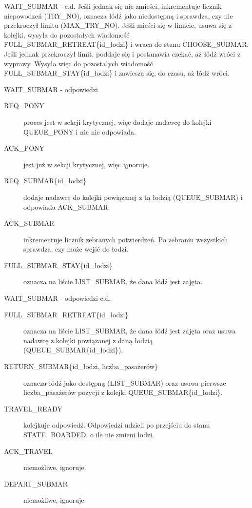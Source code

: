 \documentclass{beamer}
\begin{document}
\begin{frame}{WAIT\_SUBMAR - c.d.}
    \internallinenumbers
    \resetlinenumber[1]
    Jeśli jednak się nie zmieści, inkrementuje licznik niepowodzeń (TRY\_NO), oznacza łódź jako niedostępną i sprawdza, czy nie przekroczył limitu (MAX\_TRY\_NO). Jeśli mieści się w limicie, usuwa się z kolejki, wysyła do pozostałych wiadomość FULL\_SUBMAR\_RETREAT\{id\_łodzi\} i wraca do stanu CHOOSE\_SUBMAR. Jeśli jednak przekroczył limit, poddaje się i postanawia czekać, aż łódź wróci z wyprawy. Wysyła więc do pozostałych wiadomość FULL\_SUBMAR\_STAY\{id\_łodzi\} i zawiesza się, do czasu, aż łódź wróci.
\end{frame}

\begin{frame}{WAIT\_SUBMAR - odpowiedzi}
    \internallinenumbers
    \resetlinenumber[1]
    \begin{description}
        \item [REQ\_PONY] proces jest w sekcji krytycznej, więc dodaje nadawcę do kolejki QUEUE\_PONY i nic nie odpowiada. 
        \item [ACK\_PONY] jest już w sekcji krytycznej, więc ignoruje.
        \item [REQ\_SUBMAR\{id\_łodzi\}] dodaje nadawcę do kolejki powiązanej z tą łodzią (QUEUE\_SUBMAR) i odpowiada ACK\_SUBMAR.
        \item [ACK\_SUBMAR] inkrementuje licznik zebranych potwierdzeń. Po zebraniu wszystkich sprawdza, czy może wejść do łodzi.
        \item [FULL\_SUBMAR\_STAY\{id\_łodzi\}] oznacza na liście LIST\_SUBMAR, że dana łódź jest zajęta.

    \end{description}
\end{frame}

\begin{frame}{WAIT\_SUBMAR - odpowiedzi c.d.}
    \internallinenumbers
    \resetlinenumber[1]
    \begin{description}
        \item [FULL\_SUBMAR\_RETREAT\{id\_łodzi\}] oznacza na liście LIST\_SUBMAR, że dana łódź jest zajęta oraz usuwa nadawcę z kolejki powiązanej z daną łodzią (QUEUE\_SUBMAR\{id\_łodzi\}).
        \item [RETURN\_SUBMAR\{id\_łodzi, liczba\_pasażerów\}] oznacza łódź jako dostępną (LIST\_SUBMAR) oraz usuwa pierwsze liczba\_pasażerów pozycji z kolejki QUEUE\_SUBMAR\{id\_łodzi\}.
        \item [TRAVEL\_READY] kolejkuje odpowiedź. Odpowiedzi udzieli po przejściu do stanu STATE\_BOARDED, o ile nie zmieni łodzi.
        \item [ACK\_TRAVEL] niemożliwe, ignoruje.
        \item [DEPART\_SUBMAR] niemożliwe, ignoruje.
    \end{description}
\end{frame}
\end{document}
